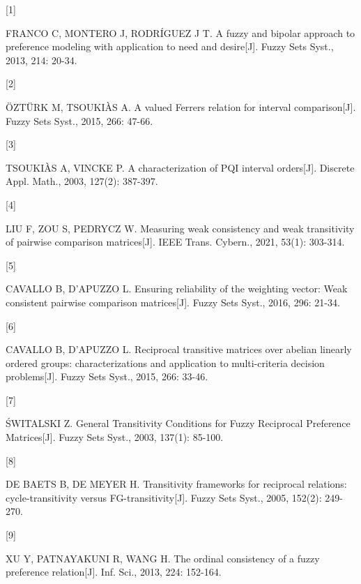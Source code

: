 \documentclass[
  letterpaper,
  DIV=11,
  numbers=noendperiod]{scrartcl}
\newlength{\cslhangindent}
\newlength{\csllabelwidth}
\newenvironment{CSLReferences}[2] %
 {\begin{list}{}{%
  \setlength{\itemindent}{0pt}
  \setlength{\leftmargin}{0pt}
  \setlength{\parsep}{0pt}
  \ifodd #1
   \setlength{\leftmargin}{\cslhangindent}
   \setlength{\itemindent}{-1\cslhangindent}
  \fi
  \setlength{\itemsep}{#2\baselineskip}}}
 {\end{list}}
\newcommand{\CSLLeftMargin}[1]{\parbox[t]{\csllabelwidth}{\strut#1\strut}}
\newcommand{\CSLRightInline}[1]{\parbox[t]{\linewidth - \csllabelwidth}{\strut#1\strut}}
\begin{document}
\label{refs}
\begin{CSLReferences}{0}{0}
\CSLLeftMargin{{[}1{]} }%
\CSLRightInline{FRANCO C, MONTERO J, RODRÍGUEZ J T. A fuzzy and bipolar
approach to preference modeling with application to need and
desire{[}J{]}. Fuzzy Sets Syst., 2013, 214: 20-34.}

\CSLLeftMargin{{[}2{]} }%
\CSLRightInline{ÖZTÜRK M, TSOUKIÀS A. A valued Ferrers relation for
interval comparison{[}J{]}. Fuzzy Sets Syst., 2015, 266: 47-66.}

\CSLLeftMargin{{[}3{]} }%
\CSLRightInline{TSOUKIÀS A, VINCKE P. A characterization of PQI interval
orders{[}J{]}. Discrete Appl. Math., 2003, 127(2): 387-397.}

\CSLLeftMargin{{[}4{]} }%
\CSLRightInline{LIU F, ZOU S, PEDRYCZ W. Measuring weak consistency and
weak transitivity of pairwise comparison matrices{[}J{]}. IEEE Trans.
Cybern., 2021, 53(1): 303-314.}

\CSLLeftMargin{{[}5{]} }%
\CSLRightInline{CAVALLO B, D'APUZZO L. Ensuring reliability of the
weighting vector: Weak consistent pairwise comparison matrices{[}J{]}.
Fuzzy Sets Syst., 2016, 296: 21-34.}

\CSLLeftMargin{{[}6{]} }%
\CSLRightInline{CAVALLO B, D'APUZZO L. Reciprocal transitive matrices
over abelian linearly ordered groups: characterizations and application
to multi-criteria decision problems{[}J{]}. Fuzzy Sets Syst., 2015, 266:
33-46.}

\CSLLeftMargin{{[}7{]} }%
\CSLRightInline{ŚWITALSKI Z. General Transitivity Conditions for Fuzzy
Reciprocal Preference Matrices{[}J{]}. Fuzzy Sets Syst., 2003, 137(1):
85-100.}

\CSLLeftMargin{{[}8{]} }%
\CSLRightInline{DE BAETS B, DE MEYER H. Transitivity frameworks for
reciprocal relations: cycle-transitivity versus FG-transitivity{[}J{]}.
Fuzzy Sets Syst., 2005, 152(2): 249-270.}

\CSLLeftMargin{{[}9{]} }%
\CSLRightInline{XU Y, PATNAYAKUNI R, WANG H. The ordinal consistency of
a fuzzy preference relation{[}J{]}. Inf. Sci., 2013, 224: 152-164.}


\end{CSLReferences}
\end{document}
